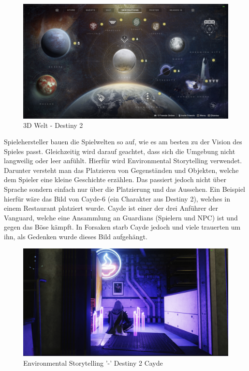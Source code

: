 
\begin{figure}
    \centering
    \includegraphics[scale=0.3]{pics/3d_welt_destiny_planets}
    \caption{3D Welt - Destiny 2}
    \label{fig:3d_environment_destiny2}
\end{figure}

Spielehersteller bauen die Spielwelten so auf, wie es am besten zu der Vision des Spieles passt.
Gleichzeitig wird darauf geachtet, dass sich die Umgebung nicht langweilig oder leer anfühlt.
Hierfür wird Environmental Storytelling verwendet.
Darunter versteht man das Platzieren von Gegenständen und Objekten,
welche dem Spieler eine kleine Geschichte erzählen.
Das passiert jedoch nicht über Sprache sondern einfach nur über die Platzierung und das Aussehen.
Ein Beispiel hierfür w\"are das Bild von Cayde-6 (ein Charakter aus Destiny 2), welches in einem Restaurant platziert wurde.
Cayde ist einer der drei Anführer der Vanguard, welche eine Ansammlung an Guardians (Spielern und NPC) ist und gegen das Böse kämpft.
In Forsaken starb Cayde jedoch und viele trauerten um ihn, als Gedenken wurde dieses Bild aufgehängt.
~\cite{GameDeveloper_2022}

\begin {figure}
    \includegraphics[scale=0.3]{pics/3d_welt_destiny2-environmental-storytelling}
    \caption{Environmental Storytelling '-' Destiny 2 Cayde}
    \label{fig:3d_environmental_storytelling_destiny2}
\end {figure}


